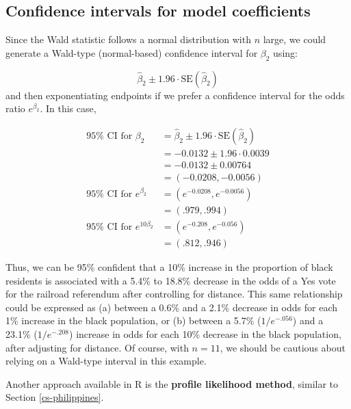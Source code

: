 \documentclass[
]{krantz}
\begin{document}
\hypertarget{confidence-intervals-for-model-coefficients}{%
\subsection{Confidence intervals for model coefficients}\label{confidence-intervals-for-model-coefficients}}

Since the Wald statistic follows a normal distribution with \(n\) large, we could generate a Wald-type (normal-based) confidence interval  for \(\beta_2\) using:

\[\hat\beta_2 \pm 1.96\cdot\textrm{SE}(\hat\beta_2)\]
and then exponentiating endpoints if we prefer a confidence interval for the odds ratio \(e^{\beta_2}\). In this case,

\begin{align*}
95\% \textrm{ CI for } \beta_2 &= \hat{\beta}_2 \pm 1.96 \cdot \textrm{SE}(\hat{\beta}_2) \\
                               &= -0.0132 \pm 1.96 \cdot 0.0039 \\
                               &= -0.0132 \pm 0.00764 \\
                               &= (-0.0208, -0.0056) \\
95\% \textrm{ CI for } e^{\beta_2} &= (e^{-0.0208}, e^{-0.0056}) \\
                                   &= (.979, .994) \\
95\% \textrm{ CI for } e^{10\beta_2} &= (e^{-0.208}, e^{-0.056}) \\
                                      &= (.812, .946)
\end{align*}

Thus, we can be 95\% confident that a 10\% increase in the proportion of black residents is associated with a 5.4\% to 18.8\% decrease in the odds of a Yes vote for the railroad referendum after controlling for distance. This same relationship could be expressed as (a) between a 0.6\% and a 2.1\% decrease in odds for each 1\% increase in the black population, or (b) between a 5.7\% (\(1/e^{-.056}\)) and a 23.1\% (\(1/e^{-.208}\)) increase in odds for each 10\% decrease in the black population, after adjusting for distance. Of course, with \(n=11\), we should be cautious about relying on a Wald-type interval in this example.

Another approach available in R is the \textbf{profile likelihood method},  similar to Section \ref{cs-philippines}.
\end{document}
